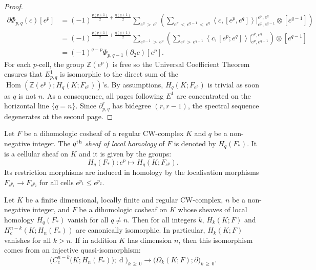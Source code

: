 \documentclass[AHL,Unicode,longabstracts,published]{cedram}
\newcommand{\Z}{\mathbb{Z}}
\DeclareMathOperator{\Hom}{Hom}
\DeclareMathOperator{\df}{d}
\begin{document}
\begin{proof}
\begin{align*}
\partial\Phi_{p,q}(c)[e^p] & =(-1)^{\frac{p(p+1)}{2}+\frac{q(q+1)}{2}} \sum_{e^q\,>\,e^p} \left(\sum_{e^p\,<\,e^{q-1}\,<\,e^q} \left\langle c,[e^p,e^q]\right\rangle \Big|^{e^p,e^q}_{e^p,e^{q-1}}\otimes\left[e^{q-1}\right] \right) \\
& = (-1)^{\frac{p(p+1)}{2}+\frac{q(q+1)}{2}} \sum_{e^{q-1}\,>\,e^p}\left(\sum_{e^q\,>\,e^{q-1}} \left\langle c, [e^p;e^q]\right\rangle \Big|^{e^p,e^q}_{e^p,e^{q-1}}\right)\otimes\left[e^{q-1}\right] \\ & = (-1)^{q-p}\Phi_{p,q-1}(\partial_2c)[e^p].
\end{align*}
For each $p$-cell, the group $\Z(e^p)$ is free so the Universal Coefficient Theorem ensures that $E^1_{p,q}$ is isomorphic to the direct sum of the $\Hom(\Z(e^p);H_q(K;F_{e^p}))$'s. By assumptions, $H_q(K;F_{e^p})$ is trivial as soon as $q$ is not $n$. As a consequence, all pages following $E^1$ are concentrated on the horizontal line $\{q=n\}$. Since $\partial^r_{p,q}$ has bidegree $(r,r-1)$, the spectral sequence degenerates at the second page.
\end{proof}

\begin{defi}\label{def:loc_hom_shea}
Let $F$ be a dihomologic cosheaf of a regular CW-complex $K$ and $q$ be a non-negative integer. The $q^{\rm th}$ \emph{sheaf of local homology} of $F$ is denoted by $H_q(F_*)$. It is a cellular sheaf on $K$ and it is given by the groups:
\begin{equation*}
H_q(F_*):e^p\mapsto H_q(K;F_{e^p}).
\end{equation*}
Its restriction morphisms are induced in homology by the localisation morphisms $F_{e^{p_1}}\rightarrow F_{e^{p_2}}$ for all cells $e^{p_1}\leq e^{p_2}$.
\end{defi}

\begin{theo}\label{thm:cell_poinca_lef}
Let $K$ be a finite dimensional, locally finite and regular CW-complex, $n$ be a non-negative integer, and $F$ be a dihomologic cosheaf on $K$ whose sheaves of local homology $H_q(F_*)$ vanish for all $q\neq n$. Then for all integers $k$, $H_k(K;F)$ and $H_c^{n-k}(K;H_n(F_*))$ are canonically isomorphic. In particular, $H_k(K;F)$ vanishes for all $k>n$. If in addition $K$ has dimension $n$, then this isomorphism comes from an injective quasi-isomorphism:
\begin{equation*}
\big(C^{n-k}_c\big(K;H_n(F_*)\big);\df\big)_{k\,\geq\,0}\rightarrow \big(\Omega_k(K;F);\partial\big)_{k\,\geq\,0}.
\end{equation*}
\end{theo}
\end{document}
